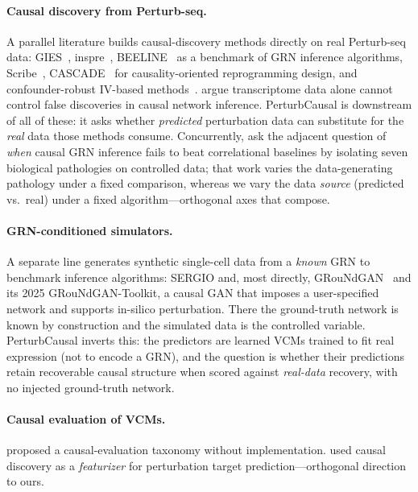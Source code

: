 \documentclass{article}
\theoremstyle{plain}
\theoremstyle{definition}
\theoremstyle{remark}
\begin{document}
\paragraph{Causal discovery from {Perturb-seq}.} A parallel literature builds causal-discovery methods directly on real Perturb-seq data: GIES~\citep{hauser2012gies}, inspre~\citep{brown2025inspre}, BEELINE~\citep{pratapa2019beeline} as a benchmark of GRN inference algorithms, Scribe~\citep{qiu2020scribe}, CASCADE~\citep{cao2025cascade} for causality-oriented reprogramming design, and confounder-robust IV-based methods~\citep{park2026confounder}. \citet{kernfeld2024fdr} argue transcriptome data alone cannot control false discoveries in causal network inference. {PerturbCausal} is downstream of all of these: it asks whether \emph{predicted} perturbation data can substitute for the \emph{real} data those methods consume. Concurrently, \citet{fernandez2026grnbreak} ask the adjacent question of \emph{when} causal GRN inference fails to beat correlational baselines by isolating seven biological pathologies on controlled data; that work varies the data-generating pathology under a fixed comparison, whereas we vary the data \emph{source} (predicted vs.\ real) under a fixed algorithm---orthogonal axes that compose.

\paragraph{GRN-conditioned simulators.} A separate line generates synthetic single-cell data from a \emph{known} GRN to benchmark inference algorithms: SERGIO and, most directly, GRouNdGAN~\citep{zinati2024groundgan} and its 2025 GRouNdGAN-Toolkit, a causal GAN that imposes a user-specified network and supports in-silico perturbation. There the ground-truth network is known by construction and the simulated data is the controlled variable. PerturbCausal inverts this: the predictors are learned VCMs trained to fit real expression (not to encode a GRN), and the question is whether their predictions retain recoverable causal structure when scored against \emph{real-data} recovery, with no injected ground-truth network.

\paragraph{Causal evaluation of VCMs.} \citet{vc_causal_2025} proposed a causal-evaluation taxonomy without implementation. \citet{wu2025cdn} used causal discovery as a \emph{featurizer} for perturbation target prediction---orthogonal direction to ours.
\end{document}
